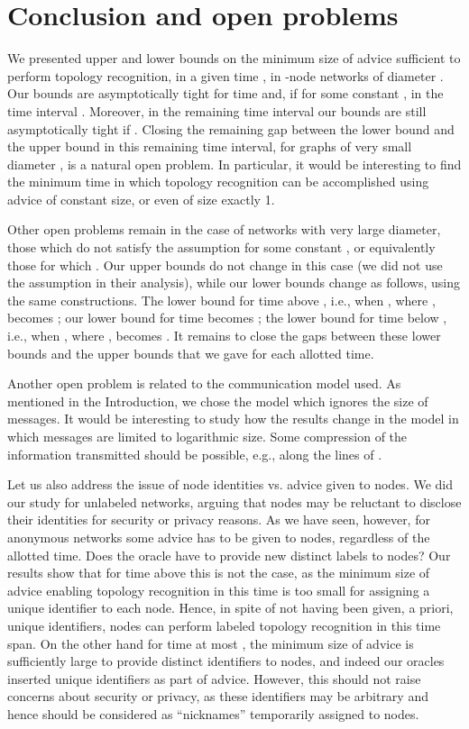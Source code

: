 \documentclass{article}
\begin{document}
\section{Conclusion and open problems}
We presented upper and lower bounds on the minimum size of advice sufficient to perform topology recognition, in a given time , in -node networks of diameter . 
Our bounds are asymptotically tight for time  and, if  for some constant , in the time interval .
Moreover, in the remaining time interval  our bounds are still asymptotically tight if .
Closing the remaining gap between the lower bound  and the upper bound  in this remaining time interval, for graphs of very small diameter , is a natural open problem. In particular, it would be interesting to find the minimum time in which topology recognition can be accomplished using advice of constant size, or even of size exactly 1.

Other open problems remain in the case of networks with very large diameter, those which do not satisfy the assumption  for some constant , or equivalently those for which .
Our upper bounds do not change in this case (we did not use the assumption  in their analysis), while our lower bounds change as follows, using the same constructions.
The lower bound for time above , i.e., when , where , becomes ;
our lower bound for time  becomes ;
the lower bound for time below , i.e., when , where , becomes . It remains to close the gaps between these lower bounds and the upper bounds that we gave for each allotted time.

Another open problem is related to the communication model used. As mentioned in the Introduction, we chose the  model which ignores the size of messages. It would be interesting to 
study how the results change in the  model in which messages are limited to logarithmic size. Some compression of the information transmitted should be possible, e.g., along the lines of \cite{Ta}.

Let us also address the issue of node identities vs. advice given to nodes.
We did our study for unlabeled networks, arguing that nodes may be reluctant to disclose their identities for security or privacy reasons.
As we have seen, however, for anonymous networks some advice has to be given to nodes, regardless of the allotted time.
Does the oracle have to provide new distinct labels to nodes?
Our results show that for time above  this is not the case, as the minimum size of advice enabling topology recognition in this time is too small for assigning a unique identifier to each node.
Hence, in spite of not having been given, a priori, unique identifiers, nodes can perform labeled topology recognition in this time span.
On the other hand for time at most , the minimum size of advice is sufficiently large to provide distinct identifiers to nodes, and indeed our oracles inserted unique identifiers as part of advice. However, this should not raise concerns about security or privacy, as these identifiers may be arbitrary and hence should be considered as ``nicknames'' temporarily assigned to nodes. 
\end{document}
